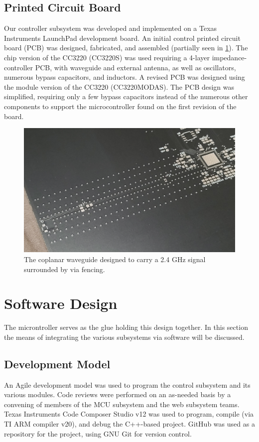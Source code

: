 \documentclass[journal]{IEEEtran}
\begin{document}
\subsection{Printed Circuit Board} Our controller subsystem was developed and implemented on a Texas Instruments LaunchPad development board. An initial control printed circuit board (PCB) was designed, fabricated, and assembled (partially seen in \ref{fig:mcu_v1_cpwg}). The chip version of the CC3220 (CC3220S) was used requiring a 4-layer impedance-controller PCB, with waveguide and external antenna, as well as oscillators, numerous bypass capacitors, and inductors. A revised PCB was designed using the module version of the CC3220 (CC3220MODAS). The PCB design was simplified, requiring only a few bypass capacitors instead of the numerous other components to support the microcontroller found on the first revision of the board.

\begin{figure}[H]
    \centering
    \label{fig:mcu_v1_cpwg}
    \includegraphics[width=\linewidth]{images/mcu_v1_cpwg.jpg}
    \caption{The coplanar waveguide designed to carry a 2.4 GHz signal surrounded by via fencing.}
\end{figure}

\section{Software Design}

The microntroller serves as the glue holding this design together. In this section the means of
integrating the various subsystems via software will be discussed.
\subsection{Development Model}
An Agile development model was used to program the control subsystem and its various modules. Code reviews were performed on an as-needed basis by a convening of members of the MCU subsystem and the web subsystem teams. Texas Instruments Code Composer Studio v12 was used to program, compile (via TI ARM compiler v20), and debug the C++-based project. GitHub was used as a repository for the project, using GNU Git for version control.
\end{document}
